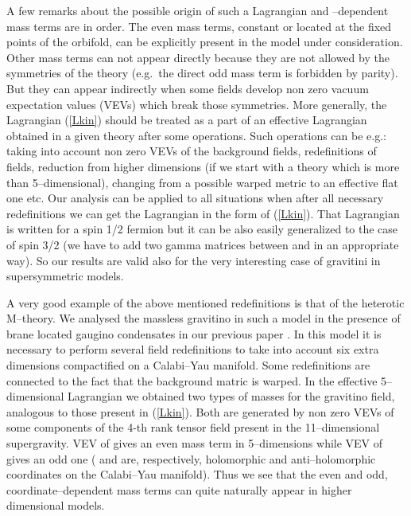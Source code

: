 \documentclass[a4paper,12pt]{article}
\def\ZZ{\mathbb Z}
\begin{document}
A few remarks about the possible origin of such a Lagrangian and 
\coordHE{}--dependent mass terms are in order. The even mass terms, constant
or located at the fixed points of the orbifold, can be explicitly
present in the model under consideration. Other mass terms can not 
appear directly because they are not allowed by the symmetries of the
theory (e.g.\ the direct odd mass term is forbidden by \myHighlight{$\ZZ_2$}\coordHE{}
parity). But they can appear indirectly when some fields develop non
zero vacuum expectation values 
(VEVs) which break those symmetries. More generally, the Lagrangian
(\ref{Lkin}) should be treated as a part of an effective Lagrangian
obtained in a given theory after some operations. Such operations can
be e.g.: taking into account non zero VEVs of the background fields,
redefinitions of fields, reduction from higher dimensions (if we start
with a theory which is more than 5--dimensional),
changing from a possible warped metric to an effective flat one etc.
Our analysis can be applied to all situations when after all necessary
redefinitions we can get the Lagrangian in the form of (\ref{Lkin}). 
That Lagrangian is written for a spin 1/2 fermion but it can be also
easily generalized to the case of spin 3/2 (we have to add two
gamma matrices between \coordHE{} and \coordHE{} in an appropriate
way). So our results are valid also for the very interesting case of
gravitini in supersymmetric models.


A very good example of the above mentioned redefinitions is that of the
heterotic M--theory. We analysed the massless gravitino in such a model
in the presence of brane located gaugino condensates in our previous
paper \cite{Meissner:1999ja}. In this model it is necessary to perform
several field redefinitions to take into account six extra dimensions
compactified on a Calabi--Yau manifold. Some redefinitions are
connected to the fact that the background matric is warped. In the
effective 5--dimensional Lagrangian we obtained two types of masses
for the gravitino field, analogous to those present in (\ref{Lkin}).
Both are generated by non zero VEVs of some components of the 4-th
rank tensor field \coordHE{} present in the 11--dimensional
supergravity. VEV of \coordHE{} gives an even mass term in
5--dimensions while VEV of \coordHE{} gives an odd one
(\coordHE{} and \coordHE{} are, 
respectively, holomorphic and anti--holomorphic coordinates on the
Calabi--Yau manifold). Thus we see that the \myHighlight{$\ZZ_2$}\coordHE{} even and odd,
coordinate--dependent mass terms can quite naturally appear in
higher dimensional models.
\end{document}
